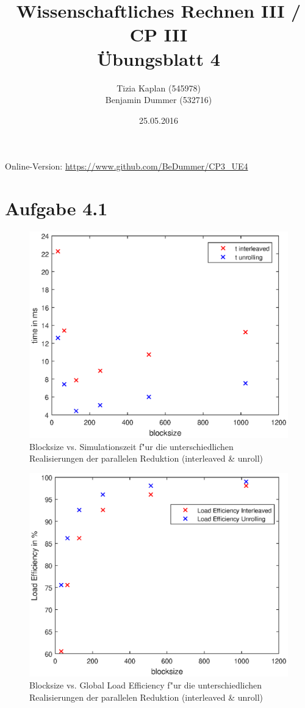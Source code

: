 \documentclass[%
	paper=A4,	%
	pagesize,	%
	DIV=calc,	%
	smallheadings,	%
	ngerman		%
]{scrartcl}
\title{{\bf Wissenschaftliches Rechnen III / CP III}\\Übungsblatt 4}
\author{Tizia Kaplan (545978)\\Benjamin Dummer (532716)}
\date{25.05.2016}
\begin{document}
\maketitle
Online-Version: \href{https://www.github.com/BeDummer/CP3_UE4}{\url{https://www.github.com/BeDummer/CP3_UE4}}

\section*{Aufgabe 4.1}

\begin{figure}
  \centering
  \includegraphics[width=.8\textwidth]{blocksize_vs_time_interl_unroll.eps}
  \caption{Blocksize vs. Simulationszeit f"ur die unterschiedlichen Realisierungen der parallelen Reduktion (interleaved \& unroll)}
\end{figure}

\begin{figure}
  \centering
  \includegraphics[width=.8\textwidth]{blocksize_vs_load_efficiency.eps}
  \caption{Blocksize vs. Global Load Efficiency f"ur die unterschiedlichen Realisierungen der parallelen Reduktion (interleaved \& unroll)}
\end{figure}
\end{document}

